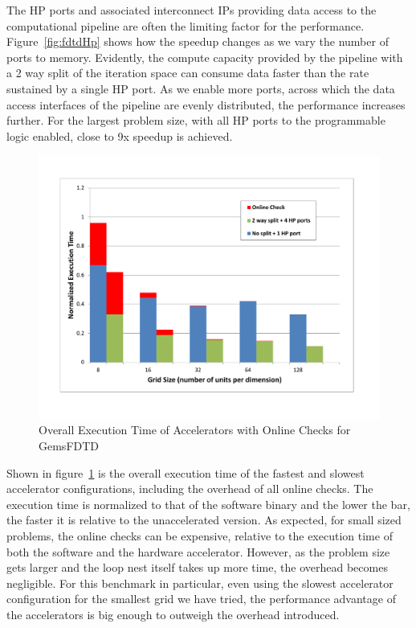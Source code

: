 The HP ports and associated interconnect IPs providing data access to the computational pipeline are often the limiting factor for the performance. Figure~\ref{fig:fdtdHp} shows how the speedup changes as we vary the number of ports to memory. Evidently, the compute capacity provided by the pipeline with a 2 way split of the iteration space can consume data faster than the rate sustained by a single HP port. As we enable more ports, across which the data access interfaces of the pipeline are evenly distributed, the performance increases further. For the largest problem size, with all HP ports to the programmable logic enabled, close to 9x speedup is achieved.



\begin{figure}[htp]
\begin{center}
\includegraphics[width=1.0\linewidth]{chap6fig/fdtd2phase_2.pdf}
\caption{Overall Execution Time of Accelerators with Online Checks for GemsFDTD
\label{fig:fdtdOverhead}}
\end{center}
\end{figure}

Shown in figure~\ref{fig:fdtdOverhead} is the overall execution time of the fastest and slowest accelerator configurations, including the overhead of all online checks. The execution time is normalized to that of the software binary and the lower the bar, the faster it is relative to the unaccelerated version. As expected, for small sized problems, the online checks can be expensive, relative to the execution time of both the software and the hardware accelerator. However, as the problem size gets larger and the loop nest itself takes up more time, the overhead becomes negligible. For this benchmark in particular, even using the slowest accelerator configuration for the smallest grid we have tried, the performance advantage of the accelerators is big enough to outweigh the overhead introduced. 

